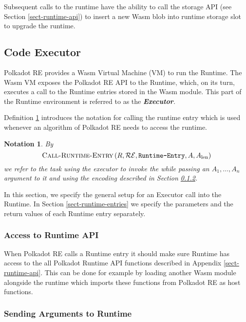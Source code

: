 \documentclass{article}
\newcommand{\tmem}[1]{{\em #1\/}}
\newcommand{\tmname}[1]{\textsc{#1}}
\newcommand{\tmop}[1]{\ensuremath{\operatorname{#1}}}
\newcommand{\tmstrong}[1]{\textbf{#1}}
\newcommand{\tmtextbf}[1]{{\bfseries{#1}}}
\newcommand{\tmtextit}[1]{{\itshape{#1}}}
\newcommand{\tmtextsc}[1]{{\scshape{#1}}}
\newcommand{\tmtexttt}[1]{{\ttfamily{#1}}}
\newcommand{\tmverbatim}[1]{{\ttfamily{#1}}}
\newtheorem{notation}{Notation}
\providecommand{\tmem}[1]{\tmtextit{#1}}
\providecommand{\tmname}[1]{\tmtextsc{#1}}
\providecommand{\tmop}[1]{\ensuremath{\mathrm{#1}}}
\providecommand{\tmstrong}[1]{\tmtextbf{#1}}
\providecommand{\tmtextbf}[1]{\tmtextbf{#1}}
\providecommand{\tmtextit}[1]{\tmtextit{#1}}
\providecommand{\tmverbatim}[1]{\tmtexttt{#1}}
\newtheorem{notation}{Notation}
\begin{document}
Subsequent calls to the runtime have the ability to call the storage API (see
Section \ref{sect-runtime-api}) to insert a new Wasm blob into runtime storage
slot to upgrade the runtime.

\subsection{Code Executor}

Polkadot RE provides a Wasm Virtual Machine (VM) to run the Runtime. The Wasm
VM exposes the Polkadot RE API to the Runtime, which, on its turn, executes a
call to the Runtime entries stored in the Wasm module. This part of the
Runtime environment is referred to as the {\tmem{{\tmstrong{Executor}}.}}

Definition \ref{nota-call-into-runtime} introduces the notation for calling
the runtime entry which is used whenever an algorithm of Polkadot RE needs to
access the runtime.

\begin{notation}
  \label{nota-call-into-runtime} By
  \[ \text{{\tmname{Call-Runtime-Entry}}} \left( R, \mathcal{R}\mathcal{E},
     \text{\tmverbatim{Runtime-Entry}}, A, A_{\tmop{len}} \right) \]
  we refer to the task using the executor to invoke the
  \tmverbatim{Runtime-Entry} while passing an $A_1, \ldots, A_n$ argument to
  it and using the encoding described in Section
  \ref{sect-send-args-to-runtime}.
\end{notation}

In this section, we specify the general setup for an Executor call into the
Runtime. In Section \ref{sect-runtime-entries} we specify the parameters and
the return values of each Runtime entry separately.

\subsubsection{Access to Runtime API}

When Polkadot RE calls a Runtime entry it should make sure Runtime has access
to the all Polkadot Runtime API functions described in Appendix
\ref{sect-runtime-api}. This can be done for example by loading another Wasm
module alongside the runtime which imports these functions from Polkadot RE as
host functions.

\subsubsection{Sending Arguments to Runtime }\label{sect-send-args-to-runtime}
\end{document}
